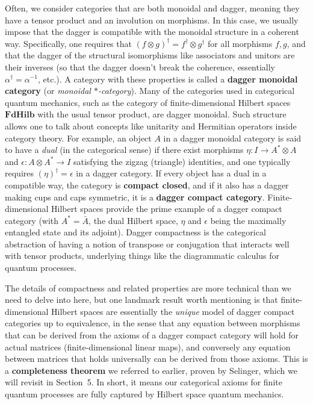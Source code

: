 \vspace{1em}
Often, we consider categories that are both monoidal and dagger, meaning they have a tensor product and an involution on morphisms. In this case, we usually impose that the dagger is compatible with the monoidal structure in a coherent way. Specifically, one requires that $(f \otimes g)^\dagger = f^\dagger \otimes g^\dagger$ for all morphisms $f, g$, and that the dagger of the structural isomorphisms like associators and unitors are their inverses (so that the dagger doesn't break the coherence, essentially $\alpha^\dagger = \alpha^{-1}$, etc.). A category with these properties is called a \textbf{dagger monoidal category} (or \emph{monoidal $*$-category}). Many of the categories used in categorical quantum mechanics, such as the category of finite-dimensional Hilbert spaces $\mathbf{FdHilb}$ with the usual tensor product, are dagger monoidal. Such structure allows one to talk about concepts like unitarity and Hermitian operators inside category theory. For example, an object $A$ in a dagger monoidal category is said to have a \emph{dual} (in the categorical sense) if there exist morphisms $\eta: I \to A^* \otimes A$ and $\epsilon: A \otimes A^* \to I$ satisfying the zigzag (triangle) identities, and one typically requires $(\eta)^\dagger = \epsilon$ in a dagger category. If every object has a dual in a compatible way, the category is \textbf{compact closed}, and if it also has a dagger making cups and caps symmetric, it is a \textbf{dagger compact category}. Finite-dimensional Hilbert spaces provide the prime example of a dagger compact category (with $A^* = \bar{A}$, the dual Hilbert space, $\eta$ and $\epsilon$ being the maximally entangled state and its adjoint). Dagger compactness is the categorical abstraction of having a notion of transpose or conjugation that interacts well with tensor products, underlying things like the diagrammatic calculus for quantum processes.

\vspace{1em}
The details of compactness and related properties are more technical than we need to delve into here, but one landmark result worth mentioning is that finite-dimensional Hilbert spaces are essentially the \emph{unique} model of dagger compact categories up to equivalence, in the sense that any equation between morphisms that can be derived from the axioms of a dagger compact category will hold for actual matrices (finite-dimensional linear maps), and conversely any equation between matrices that holds universally can be derived from those axioms. This is a \textbf{completeness theorem} we referred to earlier, proven by Selinger, which we will revisit in Section~5. In short, it means our categorical axioms for finite quantum processes are fully captured by Hilbert space quantum mechanics.

